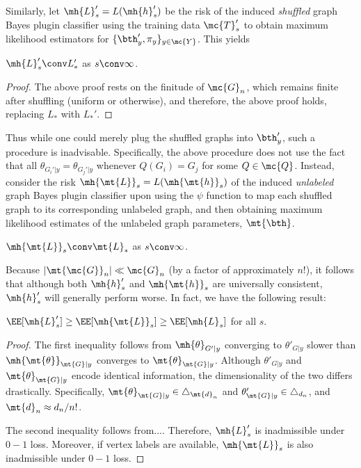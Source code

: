 \documentclass[10pt,journal,cspaper,compsoc]{IEEEtran}
\begin{document}
Similarly, let $\mh{L}_s'=L(\mh{h}_s')$ be the risk of the induced \emph{shuffled} graph Bayes plugin classifier using the training data $\mc{T}_s'$ to obtain maximum likelihood estimators for $\{\bth_y',\pi_y\}_{y \in \mc{Y}}$.  This yields
\begin{coro} \label{cor:Sh_Plug}
	$\mh{L}_s' \conv L_*'$ as $s \conv \infty$.
\end{coro}
\begin{proof}
	The above proof rests on the finitude of $\mc{G}_n$, which remains finite after shuffling (uniform or otherwise), and therefore, the above proof holds, replacing $L_*$ with $L_*'$.
\end{proof}



Thus while one could merely plug the shuffled graphs into $\bth_y'$, such a procedure is inadvisable.  Specifically, the above procedure does not  use the fact that all $\theta_{G_i'|y} = \theta_{G_j'|y}$ whenever $Q(G_i)=G_j$ for some $Q \in \mc{Q}$.  Instead, consider the risk $\mh{\mt{L}}_s=L(\mh{\mt{h}}_s)$ of the induced \emph{unlabeled} graph Bayes plugin classifier upon using the $\psi$ function to map each shuffled graph to its corresponding unlabeled graph, and then obtaining maximum likelihood estimates of the unlabeled graph parameters, $\mt{\bth}$.  
\begin{coro} \label{cor:Sh_Plug}
	$\mh{\mt{L}}_s \conv \mt{L}_*$ as $s \conv \infty$.
\end{coro}

Because $|\mt{\mc{G}}_n| \ll \mc{G}_n$ (by a factor of approximately $n!$), it follows that although both $\mh{h}_s'$ and $\mh{\mt{h}}_s$ are universally consistent, $\mh{h}_s'$ will generally perform worse.  In fact, we have the following result:
\begin{thm} \label{thm:inadmiss}
	$\EE[\mh{L}_s'] \geq \EE[\mh{\mt{L}}_s] \geq \EE[\mh{L}_s]$ for all $s$. 
\end{thm}
\begin{proof}
	The first inequality follows from $\mh{\theta}_{G'|y}$ converging to $\theta'_{G|y}$ slower than $\mh{\mt{\theta}}_{\mt{G}|y}$ converges to $\mt{\theta}_{\mt{G}|y}$.  Although $\theta'_{G|y}$ and  $\mt{\theta}_{\mt{G}|y}$ encode identical information, the dimensionality of the two differs drastically.  Specifically, $\mt{\theta}_{\mt{G}|y} \in \triangle_{\mt{d}_n}$ and $\theta'_{\mt{G}|y} \in \triangle_{d_n}$, and $\mt{d}_n \approx d_n/n!$.
	
	The second inequality follows from....
	Therefore, $\mh{L}_s'$ is inadmissible under $0-1$ loss. Moreover, if vertex labels are available, $\mh{\mt{L}}_s$ is also inadmissible under $0-1$ loss.  
\end{proof}
\end{document}
